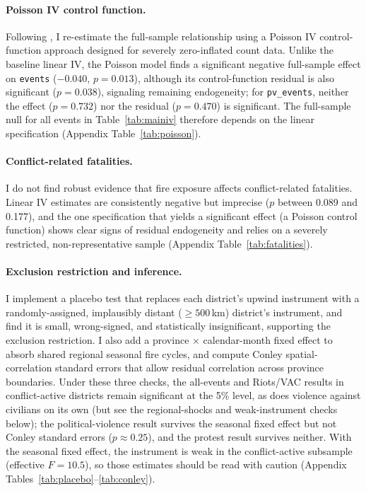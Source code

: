 \documentclass[12pt]{article}
\begin{document}
\paragraph{Poisson IV control function.} Following \citet{lu2023fish}, I re-estimate the full-sample relationship using a Poisson IV control-function approach \citep{terzabasurathouz2008} designed for severely zero-inflated count data. Unlike the baseline linear IV, the Poisson model finds a significant negative full-sample effect on \texttt{events} ($-0.040$, $p=0.013$), although its control-function residual is also significant ($p=0.038$), signaling remaining endogeneity; for \texttt{pv\_events}, neither the effect ($p=0.732$) nor the residual ($p=0.470$) is significant. The full-sample null for all events in Table~\ref{tab:mainiv} therefore depends on the linear specification (Appendix Table~\ref{tab:poisson}).

\paragraph{Conflict-related fatalities.} I do not find robust evidence that fire exposure affects conflict-related fatalities. Linear IV estimates are consistently negative but imprecise ($p$ between 0.089 and 0.177), and the one specification that yields a significant effect (a Poisson control function) shows clear signs of residual endogeneity and relies on a severely restricted, non-representative sample (Appendix Table~\ref{tab:fatalities}).

\paragraph{Exclusion restriction and inference.} I implement a placebo test that replaces each district's upwind instrument with a randomly-assigned, implausibly distant ($\geq 500$\,km) district's instrument, and find it is small, wrong-signed, and statistically insignificant, supporting the exclusion restriction. I also add a province $\times$ calendar-month fixed effect to absorb shared regional seasonal fire cycles, and compute Conley spatial-correlation standard errors that allow residual correlation across province boundaries. Under these three checks, the all-events and Riots/VAC results in conflict-active districts remain significant at the 5\% level, as does violence against civilians on its own (but see the regional-shocks and weak-instrument checks below); the political-violence result survives the seasonal fixed effect but not Conley standard errors ($p \approx 0.25$), and the protest result survives neither. With the seasonal fixed effect, the instrument is weak in the conflict-active subsample (effective $F = 10.5$), so those estimates should be read with caution (Appendix Tables~\ref{tab:placebo}--\ref{tab:conley}).
\end{document}
